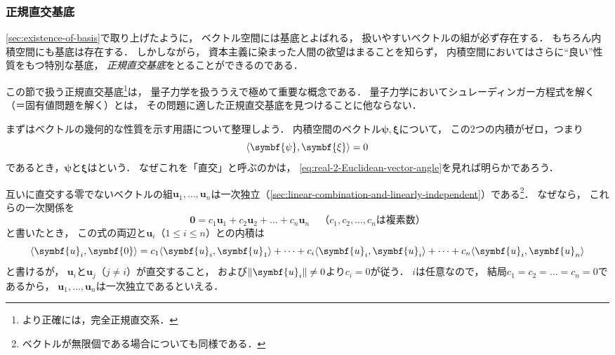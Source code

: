 \documentclass[
]{sotsu}
\newcommand{\bpsi}{\symbf{\psi}}
\newcommand{\bxi}{\symbf{\xi}}
\begin{document}
\subsubsection{正規直交基底}
\label{sec:ONB}

\cref{sec:existence-of-basis}で取り上げたように，
ベクトル空間には基底とよばれる，
扱いやすいベクトルの組が必ず存在する．
もちろん内積空間にも基底は存在する．
しかしながら，
資本主義に染まった人間の欲望はまることを知らず，
内積空間においてはさらに``良い''性質をもつ特別な基底，
\emph{正規直交基底}をとることができるのである．

この節で扱う正規直交基底\footnote{
    より正確には，完全正規直交系．
}は，
量子力学を扱ううえで極めて重要な概念である．
量子力学においてシュレーディンガー方程式を解く（＝固有値問題を解く）とは，
その問題に適した正規直交基底を見つけることに他ならない．



\quad 
まずはベクトルの幾何的な性質を示す用語について整理しよう．
内積空間のベクトル$\bpsi, \bxi$について，
この2つの内積がゼロ，つまり
\begin{equation}
    \label{eq:orthogonal}
    \iparen{\bpsi, \bxi} = 0
\end{equation}
であるとき，$\bpsi$と$\bxi$はという．
なぜこれを「直交」と呼ぶのかは，
\cref{eq:real-2-Euclidean-vector-angle}を見れば明らかであろう．

互いに直交する零でないベクトルの組$\symbf{u}_1, \dots, \symbf{u}_n$は一次独立（\cref{sec:linear-combination-and-linearly-independent}）である\footnote{
    ベクトルが無限個である場合についても同様である．
}．
なぜなら，
これらの一次関係を
\begin{equation*}
    \symbf{0} = c_1 \symbf{u}_1 + c_2 \symbf{u}_2 + \dots + c_n \symbf{u}_n
    \quad 
    \text{（$c_1, c_2, \dots, c_n$は複素数）}
\end{equation*}
と書いたとき，
この式の両辺と$\symbf{u}_i$（$1 \leq i \leq n$）との内積は
\begin{equation*}
    \iparen{\symbf{u}_i, \symbf{0}}
    = c_1 \iparen{\symbf{u}_i, \symbf{u}_1}
    + \dots 
    + c_i \iparen{\symbf{u}_i, \symbf{u}_i}
    + \dots 
    + c_n \iparen{\symbf{u}_i, \symbf{u}_n}
\end{equation*}
と書けるが，
$\symbf{u}_i$と$\symbf{u}_j$（$j \neq i$）が直交すること，
および$\norm{\symbf{u}_i} \neq 0$より$c_i = 0$が従う．
$i$は任意なので，
結局$c_1 = c_2 = \dots = c_n = 0$であるから，
$\symbf{u}_1, \dots, \symbf{u}_n$は一次独立であるといえる．
\end{document}
